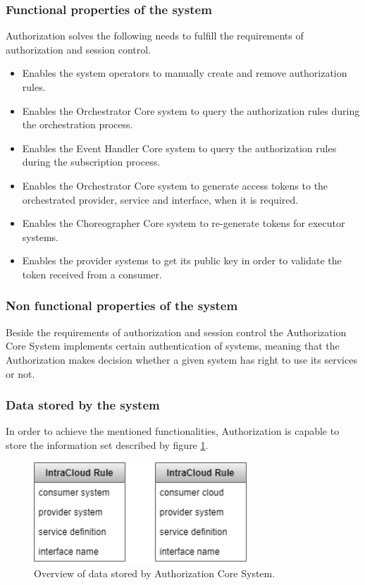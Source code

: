 \documentclass[a4paper]{arrowhead}
\begin{document}
\subsubsection {Functional properties of the system}
Authorization solves the following needs to fulfill the requirements of authorization and session control.

\begin{itemize}
    \item Enables the system operators to manually create and remove authorization rules.
    \item Enables the Orchestrator Core system to query the authorization rules during the orchestration process.
    \item Enables the Event Handler Core system to query the authorization rules during the subscription process.
    \item Enables the Orchestrator Core system to generate access tokens to the orchestrated provider, service and interface, when it is required.
    \item Enables the Choreographer Core system to re-generate tokens for executor systems.
    \item Enables the provider systems to get its public key in order to validate the token received from a consumer.
\end{itemize}

\subsubsection {Non functional properties of the system}
Beside the requirements of authorization and session control the Authorization Core System implements certain authentication of systems, meaning that the Authorization makes decision whether a given system has right to use its services or not.

\clearpage

\subsubsection {Data stored by the system}
In order to achieve the mentioned functionalities, Authorization is capable to store the information set described by figure \ref{fig:information_overview}.

\begin{figure}[h!]
  \centering
  \includegraphics[width=8cm]{figures/authorization_data_overview.png}
  \caption{
    Overview of data stored by Authorization Core System.
  }
  \label{fig:information_overview}
\end{figure}
\end{document}
